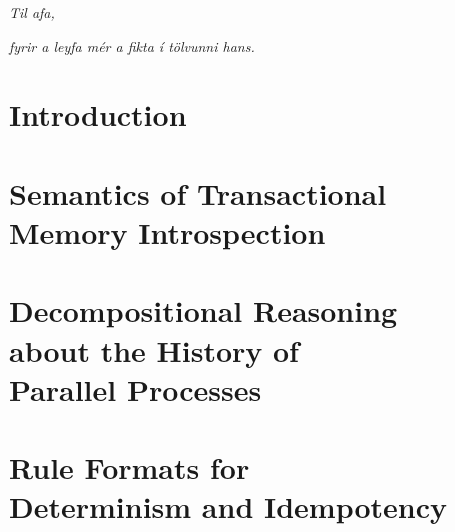\documentclass[10pt]{book}
\makeatletter
\theoremstyle{definition}
\theoremstyle{definition}
\newcommand\jointwith\relax
\renewcommand\tableofcontents{%
    \if@twocolumn
      \@restonecoltrue\onecolumn
    \else
      \@restonecolfalse
    \fi
    \chapter*{\contentsname
        \@mkboth{%
           {\upshape\scshape\MakeLowercase\contentsname}}{{\upshape\scshape\MakeLowercase\contentsname}}}%
    \@starttoc{toc}%
    \if@restonecol\twocolumn\fi
    }
\makeatother
\begin{document}
\newpage
\thispagestyle{empty}
\mbox{}

\newpage
\thispagestyle{empty}
\null\vfill
\begin{center}
    \textit{\large Til afa,}\par
    \vspace{.5em}
    \textit{fyrir a\dh{} leyfa m{\'e}r a\dh{} fikta {\'i} t{\"o}lvunni hans.}
\vspace{12pt}
\end{center}
\null\vfill

\tableofcontents

\mainmatter{}

\chapter{Introduction}


\renewcommand{\jointwith}{\'Ulfar Erlingsson}
\chapter{Semantics of Transactional Memory Introspection}
\label{ch:tmi}








\renewcommand{\jointwith}{Luca Aceto, Anna Ing\'olfsdottir,\\ and MohammadReza Mousavi}
\chapter[Decompositional Reasoning about the History of Parallel Processes]{Decompositional Reasoning \\ about the History of \\ Parallel Processes}
\label{ch:decomp}







\renewcommand{\trans}[1]{\,{\stackrel{{#1}}{\rightarrow}}\,}

\renewcommand{\jointwith}{Luca Aceto, Anna Ing\'olfsdottir,\\ MohammadReza Mousavi and Michel Reniers}
\chapter[Rule Formats for Determinism and Idempotency]{Rule Formats for \\ Determinism and Idempotency}
\label{ch:formats}








\end{document}
